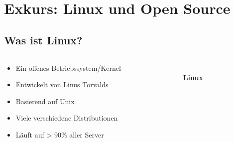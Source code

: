 \documentclass[
    ngerman,
    accentcolor=3b,
    fontsize= 12pt,
    a4paper,
    aspectratio=169,
    colorback=true,
    fancy_row_colors,
    leqno,
    fleqn,
    boxarc=3pt,
    fleqn,
    main,
    design=2008,
]{algoslides}
\begin{document}
    \section{Exkurs: Linux und Open Source}\label{2}\label{sec:linux}
    \subsection{Was ist Linux?}
    \begin{frame}[c]
        \slidehead{}
        \begin{columns}
            \begin{column}[c]{0.5\textwidth}
                \begin{itemize}
                    \item Ein offenes Betriebssystem/Kernel
                    \item Entwickelt von Linus Torvalds
                    \item Basierend auf Unix
                    \item Viele verschiedene Distributionen
                    \item Läuft auf > 90\% aller Server
                \end{itemize}
            \end{column}
            \begin{column}[c]{0.5\textwidth}
                \begin{center}
                    \fontsize{50pt}{0pt}\selectfont\faLinux{}\\[0.2cm]
                    \normalsize\textbf{Linux}
                \end{center}
            \end{column}
        \end{columns}
    \end{frame}
\end{document}
